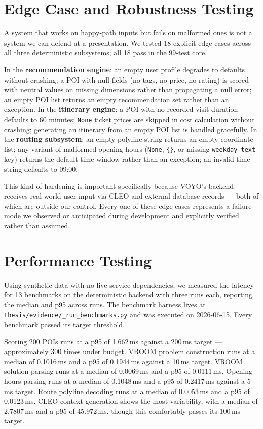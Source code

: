 \section{Edge Case and Robustness Testing}

A system that works on happy-path inputs but fails on malformed ones is not a system we can
defend at a presentation. We tested 18 explicit edge cases across all three deterministic
subsystems; all 18 pass in the 99-test core.

In the \textbf{recommendation engine}: an empty user profile degrades to defaults without
crashing; a POI with null fields (no tags, no price, no rating) is scored with neutral values on
missing dimensions rather than propagating a null error; an empty POI list returns an empty
recommendation set rather than an exception. In the \textbf{itinerary engine}: a POI with no
recorded visit duration defaults to 60 minutes; \texttt{None} ticket prices are skipped in cost
calculation without crashing; generating an itinerary from an empty POI list is handled
gracefully. In the \textbf{routing subsystem}: an empty polyline string returns an empty
coordinate list; any variant of malformed opening hours (\texttt{None}, \texttt{\{\}}, or missing
\texttt{weekday\_text} key) returns the default time window rather than an exception; an invalid
time string defaults to 09:00.

This kind of hardening is important specifically because VOYO's backend receives real-world
user input via CLEO and external database records — both of which are outside our control.
Every one of these edge cases represents a failure mode we observed or anticipated during
development and explicitly verified rather than assumed.


\section{Performance Testing}

Using synthetic data with no live service dependencies, we measured the latency for 13
benchmarks on the deterministic backend with three runs each, reporting the median and p95
across runs. The benchmark harness lives at \texttt{thesis/evidence/\_run\_benchmarks.py} and
was executed on 2026-06-15. Every benchmark passed its target threshold.

Scoring 200 POIs runs at a p95 of 1.662\,ms against a 200\,ms target — approximately 300
times under budget. VROOM problem construction runs at a median of 0.1016\,ms and a p95 of
0.1944\,ms against a 10\,ms target. VROOM solution parsing runs at a median of 0.0069\,ms
and a p95 of 0.0111\,ms. Opening-hours parsing runs at a median of 0.1048\,ms and a p95 of
0.2417\,ms against a 5\,ms target. Route polyline decoding runs at a median of 0.0053\,ms and
a p95 of 0.0123\,ms. CLEO context generation shows the most variability, with a median of
2.7807\,ms and a p95 of 45.972\,ms, though this comfortably passes its 100\,ms target.

